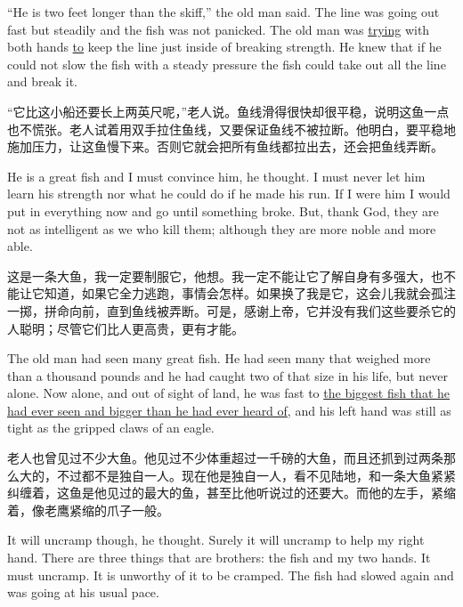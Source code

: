 \begin{paracol}{2}
\switchcolumn*

``He is two feet longer than the skiff,'' the old man said. The line was
going out fast but steadily and the fish was not \gls{panicked}. The old man
was \uline{trying} with both hands \uline{to} keep the line just inside of
breaking strength. He knew that if he could not slow the fish with a steady
pressure the fish could take out all the line and break it.

\switchcolumn

“它比这小船还要长上两英尺呢，”老人说。鱼线滑得很快却很平稳，说明这鱼一点也不慌张。老人试着用双手拉住鱼线，又要保证鱼线不被拉断。他明白，要平稳地施加压力，让这鱼慢下来。否则它就会把所有鱼线都拉出去，还会把鱼线弄断。

\switchcolumn*

He is a great fish and I must \gls{convince} him, he thought. I must never
let him learn his strength nor what he could do if he made his run. If I
were him I would put in everything now and go until something broke. But,
thank God, they are not as \gls{intelligent} as we who kill them; although
they are more \gls{noble} and more \gls{able}.

\switchcolumn

这是一条大鱼，我一定要制服它，他想。我一定不能让它了解自身有多强大，也不能让它知道，如果它全力逃跑，事情会怎样。如果换了我是它，这会儿我就会孤注一掷，拼命向前，直到鱼线被弄断。可是，感谢上帝，它并没有我们这些要杀它的人聪明；尽管它们比人更高贵，更有才能。

\switchcolumn*

The old man had seen many great fish. He had seen many that weighed more
than a thousand pounds and he had caught two of that size in his life, but
never alone. Now alone, and out of sight of land, he was fast to \uline{the
  biggest fish that he had ever seen and bigger than he had ever heard of},
and his left hand was still as tight as the gripped claws of an eagle.

\switchcolumn

老人也曾见过不少大鱼。他见过不少体重超过一千磅的大鱼，而且还抓到过两条那么大的，不过都不是独自一人。现在他是独自一人，看不见陆地，和一条大鱼紧紧纠缠着，这鱼是他见过的最大的鱼，甚至比他听说过的还要大。而他的左手，紧缩着，像老鹰紧缩的爪子一般。

\switchcolumn*

It will uncramp though, he thought. Surely it will uncramp to help my right
hand. There are three things that are brothers: the fish and my two hands.
It must uncramp. It is \gls{unworthy} of it to be cramped. The fish had slowed
again and was going at his \gls{usual} \gls{pace}.


\end{paracol}
